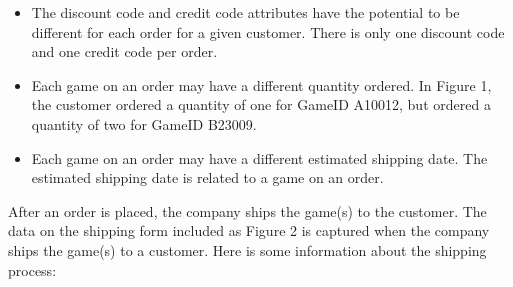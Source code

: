 \documentclass{article}
\begin{document}
\begin{itemize}
  \item The discount code and credit code attributes have the potential to be different for each order for a given customer. There is only one discount code and one credit code per order.
  
  \item Each game on an order may have a different quantity ordered. In Figure 1, the customer ordered a quantity of one for GameID A10012, but ordered a quantity of two for GameID B23009.
  
  \item Each game on an order may have a different estimated shipping date. The estimated shipping date is related to a game on an order.
\end{itemize}
After an order is placed, the company ships the game(s) to the customer. The data on the shipping form included as Figure 2 is captured when the company ships the game(s) to a customer. Here is some information about the shipping process:
\end{document}
